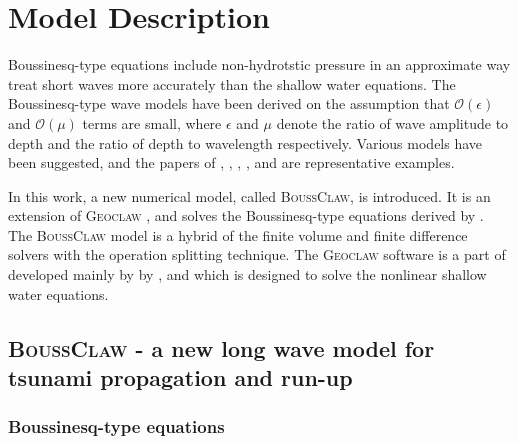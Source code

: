 \documentclass[review]{elsarticle}
\begin{document}
\section{Model Description}
\label{sec:model}

Boussinesq-type equations include non-hydrotstic pressure in an approximate way
treat short waves more accurately
than the shallow water equations. 
The Boussinesq-type wave models have been derived 
on the assumption that 
$\mathcal{O}(\epsilon)$ and $\mathcal{O}(\mu)$ terms
are small, where $\epsilon$ and $\mu$ 
denote the ratio of wave amplitude to depth
and the ratio of depth to wavelength respectively. 
Various models have been suggested,
and the papers of \citet{peregrine1967long},
\citet{madsen1992new}, \citet{nwogu1993alternative},
\citet{lynett2002modeling},
and \citet{wei1995time}
are representative examples. 

In this work, a new numerical model, 
called \textsc{BoussClaw}, is introduced. 
It is an extension of \textsc{Geoclaw} \citet{clawpack},
and solves 
the Boussinesq-type equations derived by
\citet{schaffer1993boussinesq}.
The \textsc{BoussClaw} model
is a hybrid of the finite volume and finite difference solvers
with the operation splitting technique.
The \textsc{Geoclaw} software is 
a part of \citet{clawpack}
developed mainly by
by \citet{leveque1997wave}, \citet{george2008augmented}
and \citet{BergerGeorgeLeVequeMandli11}
which is designed to solve the nonlinear shallow water equations.

\subsection{\textsc{BoussClaw} - a new long wave model for tsunami propagation and run-up}

\subsubsection{Boussinesq-type equations}
\end{document}
